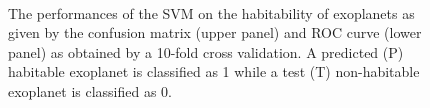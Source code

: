 \documentclass[
12pt, %
a4paper, %
oneside, %
headinclude,footinclude, %
BCOR5mm, %
]{scrartcl}
\begin{document}
\begin{figure}[h]
  \centering
{}\\
\caption{The performances of the SVM on the habitability of exoplanets as given by the confusion matrix (upper panel) and ROC curve (lower panel) as obtained by a 10-fold cross validation. A predicted (P) habitable exoplanet is classified as 1 while a test (T) non-habitable exoplanet is classified as 0.}
\label{SVM_results}
\end{figure}
\end{document}

